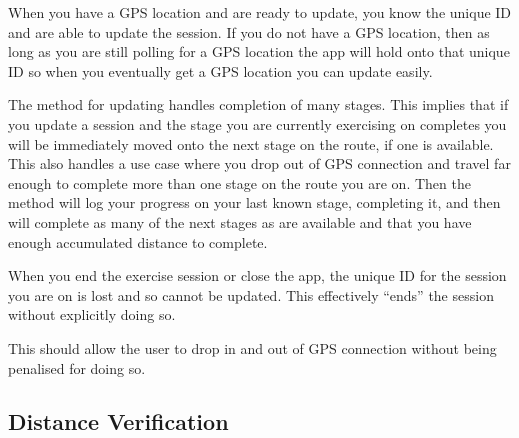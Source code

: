 When you have a GPS location and are ready to update, you know the
unique ID and are able to update the session. If you do not have a GPS
location, then as long as you are still polling for a GPS location the
app will hold onto that unique ID so when you eventually get a GPS
location you can update easily.

The method for updating handles completion of many stages. This
implies that if you update a session and the stage you are currently
exercising on completes you will be immediately moved onto the next
stage on the route, if one is available. This also handles a use case
where you drop out of GPS connection and travel far enough to complete
more than one stage on the route you are on. Then the method will log
your progress on your last known stage, completing it, and then will
complete as many of the next stages as are available and that you have
enough accumulated distance to complete.

When you end the exercise session or close the app, the unique ID for
the session you are on is lost and so cannot be updated. This
effectively ``ends'' the session without explicitly doing so.

This should allow the user to drop in and out of GPS connection
without being penalised for doing so.

\subsection{Distance Verification}

